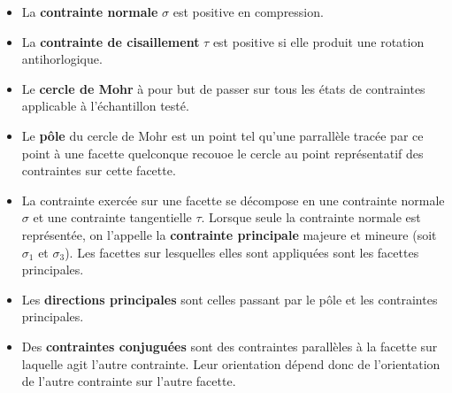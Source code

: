     \begin{itemize}
        \item La \textbf{contrainte normale} $\sigma$ est positive en compression.
        \item La \textbf{contrainte de cisaillement} $\tau$ est positive si elle produit une rotation antihorlogique.
        \item Le \textbf{cercle de Mohr} à pour but de passer sur tous les états de contraintes applicable à l'échantillon testé.
        \item Le \textbf{pôle} du cercle de Mohr est un point tel qu'une parrallèle tracée par ce point à une facette quelconque recouoe le cercle au point représentatif des contraintes sur cette facette.
        \item La contrainte exercée sur une facette se décompose en une contrainte normale $\sigma$ et une contrainte tangentielle $\tau$. Lorsque seule la contrainte normale est représentée, on l'appelle la \textbf{contrainte principale} majeure et mineure (soit $\sigma_1$ et $ \sigma_3$). Les facettes sur lesquelles elles sont appliquées sont les facettes principales.
        \item Les \textbf{directions principales} sont celles passant par le pôle et les contraintes principales.
        \item Des \textbf{contraintes conjuguées} sont des contraintes parallèles à la facette sur laquelle agit l'autre contrainte. Leur orientation dépend donc de l'orientation de l'autre contrainte sur l'autre facette. 
\end{itemize}
%
